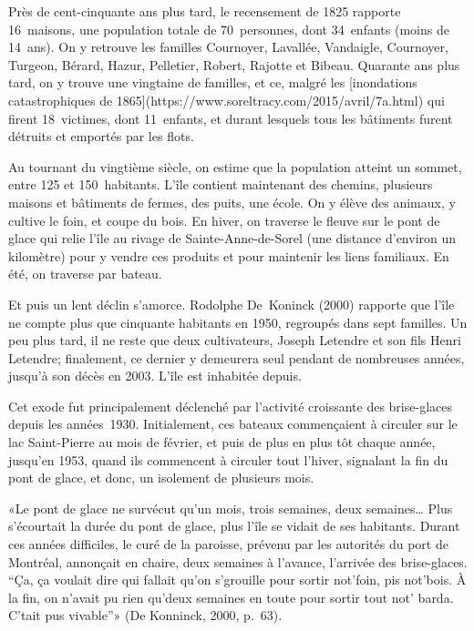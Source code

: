 \documentclass[12pt]{report}
\begin{document}
Près de cent-cinquante ans plus tard, le recensement de 1825 rapporte 16 maisons, une population totale de 70 personnes, dont 34 enfants (moins de 14 ans). On y retrouve les familles Cournoyer, Lavallée, Vandaigle, Cournoyer, Turgeon, Bérard, Hazur, Pelletier, Robert, Rajotte et Bibeau. Quarante ans plus tard, on y trouve une vingtaine de familles, et ce, malgré les [inondations catastrophiques de 1865](https://www.soreltracy.com/2015/avril/7a.html) qui firent 18 victimes, dont 11 enfants, et durant lesquels tous les bâtiments furent détruits et emportés par les flots.

Au tournant du vingtième siècle, on estime que la population atteint un sommet, entre 125 et 150 habitants. L’île contient maintenant des chemins, plusieurs maisons et bâtiments de fermes, des puits, une école. On y élève des animaux, y cultive le foin, et coupe du bois. En hiver, on traverse le fleuve sur le pont de glace qui relie l’île au rivage de Sainte-Anne-de-Sorel (une distance d’environ un kilomètre) pour y vendre ces produits et pour maintenir les liens familiaux. En été, on traverse par bateau.  

Et puis un lent déclin s’amorce. Rodolphe De Koninck (2000) rapporte que l’île ne compte plus que cinquante habitants en 1950, regroupés dans sept familles. Un peu plus tard, il ne reste que deux cultivateurs, Joseph Letendre et son fils Henri Letendre; finalement, ce dernier y demeurera seul pendant de nombreuses années, jusqu’à son décès en 2003. L’île est inhabitée depuis.  


Cet exode fut principalement déclenché par l’activité croissante des brise-glaces depuis les années 1930. Initialement, ces bateaux commençaient à circuler sur le lac Saint-Pierre au mois de février, et puis de plus en plus tôt chaque année, jusqu’en 1953, quand ils commencent à circuler tout l’hiver, signalant la fin du pont de glace, et donc, un isolement de plusieurs mois.  

«Le pont de glace ne survécut qu’un mois, trois semaines, deux semaines… Plus s’écourtait la durée du pont de glace, plus l’île se vidait de ses habitants. Durant ces années difficiles, le curé de la paroisse, prévenu par les autorités du port de Montréal, annonçait en chaire, deux semaines à l’avance, l’arrivée des brise-glaces. “Ça, ça voulait dire qui fallait qu’on s’grouille pour sortir not'foin, pis not'bois. À la fin, on n’avait pu rien qu’deux semaines en toute pour sortir tout not' barda. C’tait pus vivable”» (De Konninck, 2000, p. 63).  
\end{document}
